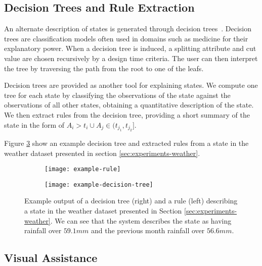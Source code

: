 \subsection{Decision Trees and Rule Extraction}

An alternate description of states is generated through decision trees~\cite{Witten:2005:DMP:1205860}. Decision
trees are classification models often used in domains such as medicine for their explanatory power.
When a decision tree is induced, a splitting attribute and cut value are chosen recursively by a
design time criteria. The user can then interpret the tree by traversing the path from the root 
to one of the leafs.

Decision trees are provided as another tool for explaining states. We compute one tree for each
state by classifying the observations of the state against the observations of all other states,
obtaining a quantitative description of the state. We then extract rules from the decision tree,
providing a short summary of the state in the form of $A_i > t_i \cup A_j \in (t_{j_1}, t_{j_2}]$.

Figure \ref{fig:example-decision-tree-and-rule} show an example decision tree and extracted rules
from a state in the weather dataset presented in section \ref{sec:experiments-weather}.

\begin{figure}[h!]
	\centering
	\begin{subfigure}{.3\columnwidth}
	  	\centering
	  	\texttt{[image: example-rule]}
  		\label{fig:example-rule}
	\end{subfigure}
	\begin{subfigure}{.68\columnwidth}
	  	\centering
	  	\texttt{[image: example-decision-tree]}
	  	\label{fig:example-decision-tree}
	\end{subfigure}
	\caption{Example output of a decision tree (right) and a rule (left) describing a state in the weather dataset presented in Section \ref{sec:experiments-weather}. We can see that the system describes the state as having rainfall over $59.1 mm$ and the previous month rainfall over $56.6 mm$.}
	\label{fig:example-decision-tree-and-rule}
\end{figure}

\iffalse

\subsection{Visual Assistance}

